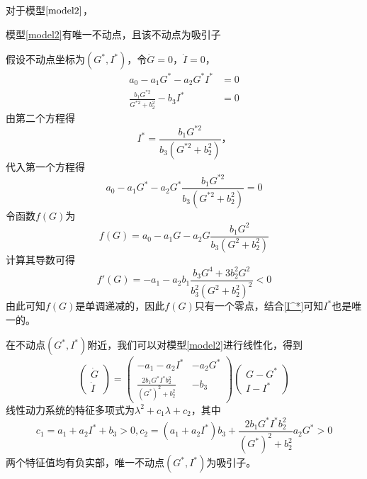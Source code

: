 对于模型$\ref{model2}$，
\begin{prop}
    模型\ref{model2}有唯一不动点，且该不动点为吸引子
\end{prop}
\begin{pf}
    假设不动点坐标为$(G^*,I^*)$，令$\dot{G} = 0$，$\dot{I} = 0$，
    \begin{equation}
        \begin{aligned}
            a_0-a_1G^*-a_2G^*I^* & = 0  \\
            \frac{b_1 G^{*2}}{G^{*2} + b_2^2} - b_3 I^* & = 0
        \end{aligned}
    \end{equation}
    由第二个方程得
    \begin{equation}\label{I^*}
        I^*= \frac{b_1 G^{*2}}{b_3(G^{*2} + b_2^2)}，
    \end{equation}
    代入第一个方程得
    \begin{equation}
        a_0-a_1G^*-a_2G^*\frac{b_1 G^{*2}}{b_3(G^{*2} + b_2^2)} = 0
    \end{equation}
    令函数$f(G)$为
    \begin{equation}
        f(G) = a_0-a_1G-a_2G\frac{b_1 G^2}{b_3(G^2 + b_2^2)}
    \end{equation}
    计算其导数可得
    \begin{equation}
        f'(G) = -a_1 - a_2b_1\frac{b_3G^4+3b_2^2G^2}{b_3^2(G^2+b_2^2)^2}<0
    \end{equation}
    由此可知$f(G)$是单调递减的，因此$f(G)$只有一个零点，结合\ref{I^*}可知$I^*$也是唯一的。

    在不动点$(G^*,I^*)$附近，我们可以对模型\ref{model2}进行线性化，得到
    \begin{equation}
        \begin{pmatrix}
            \dot{G}  \\
            \dot{I}
        \end{pmatrix}=
        \begin{pmatrix}
            -a_1-a_2I^* & -a_2G^*  \\
            \frac{2b_1G^*I^*b_2^2}{(G^*)^2+b_2^2} & -b_3
        \end{pmatrix}
        \begin{pmatrix}
            G-G^*  \\
            I-I^*
        \end{pmatrix}
    \end{equation}
    线性动力系统的特征多项式为$\lambda^2+c_1\lambda+c_2$，其中
    \begin{equation}
        c_1=a_1+a_2I^*+b_3>0, c_2=(a_1+a_2I^*)b_3+\frac{2b_1G^*I^*b_2^2}{(G^*)^2+b_2^2}a_2G^*>0
    \end{equation}
    两个特征值均有负实部，唯一不动点$(G^*,I^*)$为吸引子。
\end{pf}
